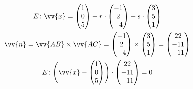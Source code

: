\begin{gather*}
  E \colon \vv{x} = \begin{pmatrix}1 \\ 0 \\ 5\end{pmatrix} + r \cdot \begin{pmatrix}-1 \\ 2 \\ -4\end{pmatrix} + s \cdot \begin{pmatrix}3 \\ 5 \\ 1\end{pmatrix} \\
  \vv{n} = \vv{AB} \times \vv{AC} = \begin{pmatrix}-1 \\ 2 \\ -4\end{pmatrix} \times \begin{pmatrix}3 \\ 5 \\ 1\end{pmatrix} = \begin{pmatrix}22 \\ -11 \\ -11\end{pmatrix} \\
  E \colon \Biggl(\vv{x} - \begin{pmatrix}1 \\ 0 \\ 5\end{pmatrix}  \Biggr) \cdot \begin{pmatrix}22 \\ -11 \\ -11\end{pmatrix} = 0
\end{gather*}
